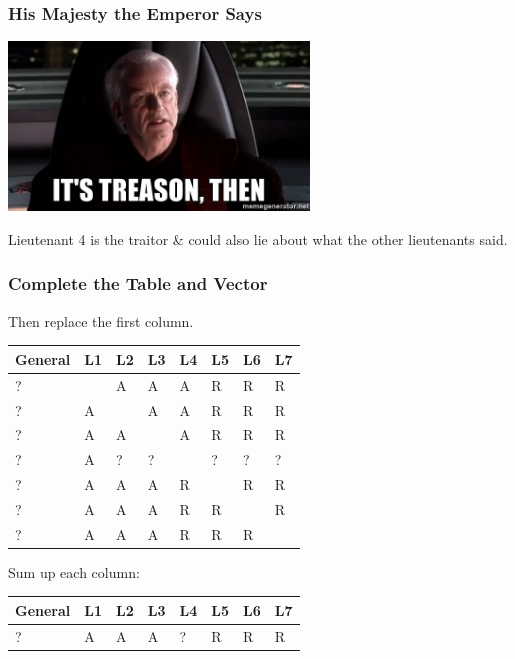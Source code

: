 \begin{frame}
	\frametitle{His Majesty the Emperor Says}
	\begin{center}
		\includegraphics[width=0.6\textwidth]{images/treason.jpg}
	\end{center}

	Lieutenant 4 is the traitor \& could also lie about what the other lieutenants said.

\end{frame}

\begin{frame}
	\frametitle{Complete the Table and Vector}

	Then replace the first column.

	\begin{center}
		\begin{tabular}{|l|l|l|l|l|l|l|l|}
			\hline
			General & L1 & L2 & L3 & L4 & L5 & L6 & L7 \\
			\hline
			?       & ~  & A  & A  & A  & R  & R  & R  \\ \hline
			?       & A  & ~  & A  & A  & R  & R  & R  \\ \hline
			?       & A  & A  & ~  & A  & R  & R  & R  \\ \hline
			?       & A  & ?  & ?  & ~  & ?  & ?  & ?  \\ \hline
			?       & A  & A  & A  & R  & ~  & R  & R  \\ \hline
			?       & A  & A  & A  & R  & R  & ~  & R  \\ \hline
			?       & A  & A  & A  & R  & R  & R  & ~  \\ \hline
		\end{tabular}
	\end{center}

	Sum up each column:

	\begin{center}
		\begin{tabular}{|l|l|l|l|l|l|l|l|}
			\hline
			General & L1 & L2 & L3 & L4 & L5 & L6 & L7 \\
			\hline
			?       & A  & A  & A  & ?  & R  & R  & R  \\
			\hline
		\end{tabular}
	\end{center}

\end{frame}

